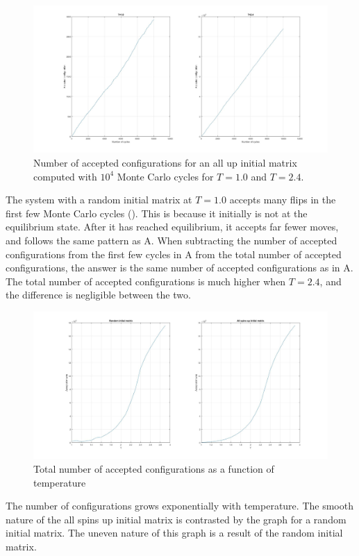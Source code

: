 \documentclass[10pt,a4paper]{article}
\begin{document}
\begin{figure} [H]
\centerline{
\includegraphics[scale=0.245]{upaccept.jpg}
}
\caption{Number of accepted configurations for an all up initial matrix computed with $10^4$ Monte Carlo cycles for $T=1.0$ and $T=2.4$.}
\label{fig:UpAccept}
\end{figure}
\noindent The system with a random initial matrix at $T=1.0$ accepts many flips in the first few Monte Carlo cycles (). This is because it initially is not at the equilibrium state. After it has reached equilibrium, it accepts far fewer moves, and follows the same pattern as  A. When subtracting the number of accepted configurations from the first few cycles in  A from the total number of accepted configurations, the answer is the same number of accepted configurations as in  A. The total number of accepted configurations is much higher when $T=2.4$, and the difference is negligible between the two.

\newpage 
\begin{figure}
\centerline{
\includegraphics[scale=0.275]{accept.jpg}
}
\caption{Total number of accepted configurations as a function of temperature}
\label{fig:Accept}
\end{figure}
\noindent The number of configurations grows exponentially with temperature. The smooth nature of the all spins up initial matrix is contrasted by the graph for a random initial matrix. The uneven nature of this graph is a result of the random initial matrix. 
\end{document}
